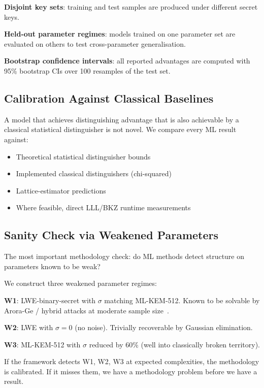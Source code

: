 \documentclass[sigconf,nonacm]{acmart}
\begin{document}
\textbf{Disjoint key sets}: training and test samples are produced
under different secret keys.

\textbf{Held-out parameter regimes}: models trained on one
parameter set are evaluated on others to test
cross-parameter generalisation.

\textbf{Bootstrap confidence intervals}: all reported advantages
are computed with 95\% bootstrap CIs over 100 resamples of the test
set.

\subsection{Calibration Against Classical Baselines}

A model that achieves distinguishing advantage that is also achievable
by a classical statistical distinguisher is not novel. We compare
every ML result against:

\begin{itemize}
  \item Theoretical statistical distinguisher bounds
  \item Implemented classical distinguishers (chi-squared)
  \item Lattice-estimator predictions
  \item Where feasible, direct LLL/BKZ runtime measurements
\end{itemize}

\subsection{Sanity Check via Weakened Parameters}

The most important methodology check: do ML methods detect
structure on parameters known to be weak?

We construct three weakened parameter regimes:

\textbf{W1}: LWE-binary-secret with $\sigma$ matching ML-KEM-512.
Known to be solvable by Arora-Ge / hybrid attacks at moderate
sample size~\cite{arora2011lwe}.

\textbf{W2}: LWE with $\sigma = 0$ (no noise). Trivially recoverable
by Gaussian elimination.

\textbf{W3}: ML-KEM-512 with $\sigma$ reduced by 60\% (well into
classically broken territory).

If the framework detects W1, W2, W3 at expected complexities, the
methodology is calibrated. If it misses them, we have a methodology
problem before we have a result.
\end{document}

